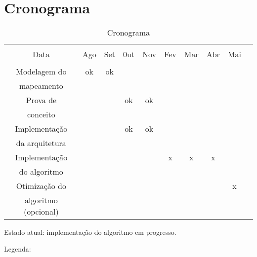 \chapter{Cronograma}\label{cap:cronograma}


\begin{table}[h]
  \begin{center}
    \begin{tabular}{|c|c|c|c|c|c|c|c|c|c|}
      \hline
                        &      &      &      &      &      &      &      &      \\
          Data          & Ago  & Set  & 0ut  & Nov  & Fev  & Mar  & Abr  & Mai  \\
                        &      &      &      &      &      &      &      &      \\
      \hline
      Modelagem do      &  ok  &  ok  &      &      &      &      &      &      \\
      mapeamento        &      &      &      &      &      &      &      &      \\
      \hline
      Prova de          &      &      &  ok  &  ok  &      &      &      &      \\
      conceito          &      &      &      &      &      &      &      &      \\
      \hline
      Implementação     &      &      &  ok  &  ok  &      &      &      &      \\
      da arquitetura    &      &      &      &      &      &      &      &      \\
      \hline
      Implementação     &      &      &      &      &  x   &  x   &  x   &      \\
      do algoritmo      &      &      &      &      &      &      &      &      \\
      \hline
      Otimização do     &      &      &      &      &      &      &      &   x  \\
      algoritmo (opcional)&    &      &      &      &      &      &      &      \\
      \hline
    \end{tabular}
    \caption{Cronograma}
    \label{tab:crono}
  \end{center}
\end{table}


Estado atual: implementação do algoritmo em progresso.

Legenda:

